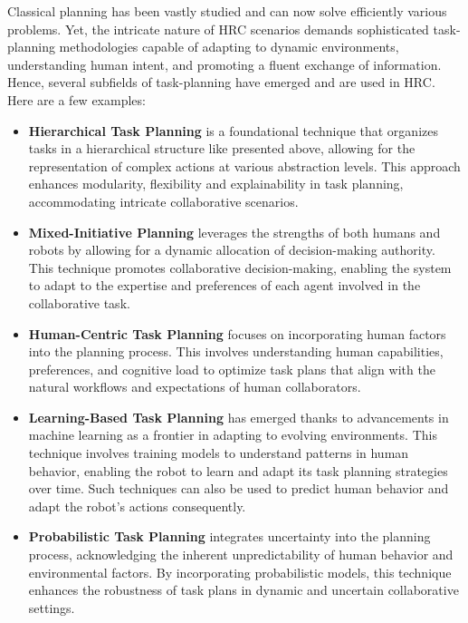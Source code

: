 Classical planning has been vastly studied and can now solve efficiently various problems. Yet, the intricate nature of HRC scenarios demands sophisticated task-planning methodologies capable of adapting to dynamic environments, understanding human intent, and promoting a fluent exchange of information. Hence, several subfields of task-planning have emerged and are used in HRC. Here are a few examples:

\begin{itemize}
    \item \textbf{Hierarchical Task Planning} is a foundational technique that organizes tasks in a hierarchical structure like presented above, allowing for the representation of complex actions at various abstraction levels. This approach enhances modularity, flexibility and explainability in task planning, accommodating intricate collaborative scenarios.
    
    \item \textbf{Mixed-Initiative Planning} leverages the strengths of both humans and robots by allowing for a dynamic allocation of decision-making authority. This technique promotes collaborative decision-making, enabling the system to adapt to the expertise and preferences of each agent involved in the collaborative task.
    
    \item \textbf{Human-Centric Task Planning} focuses on incorporating human factors into the planning process. This involves understanding human capabilities, preferences, and cognitive load to optimize task plans that align with the natural workflows and expectations of human collaborators.
    
    \item \textbf{Learning-Based Task Planning} has emerged thanks to advancements in machine learning as a frontier in adapting to evolving environments. This technique involves training models to understand patterns in human behavior, enabling the robot to learn and adapt its task planning strategies over time. Such techniques can also be used to predict human behavior and adapt the robot's actions consequently.
    
    \item \textbf{Probabilistic Task Planning} integrates uncertainty into the planning process, acknowledging the inherent unpredictability of human behavior and environmental factors. By incorporating probabilistic models, this technique enhances the robustness of task plans in dynamic and uncertain collaborative settings.
\end{itemize}

